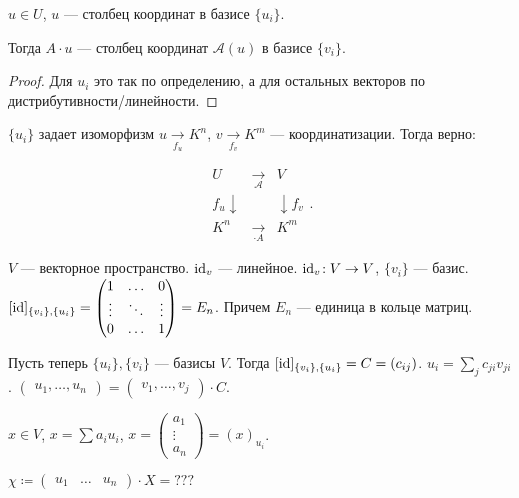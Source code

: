 \begin{statement}
    $u \in U$,  $u$ --- столбец координат в базисе  $\{u_i\}$.

    Тогда  $A \cdot u$ --- столбец координат  $\mathcal{A}(u)$ в базисе  $\{v_i\}$.
\end{statement}
\begin{proof}
    Для $u_i$ это так по определению, а для остальных векторов по дистрибутивности/линейности. 
\end{proof}
\begin{remark}
    $\{u_i\}$ задает изоморфизм  $u \xrightarrow[f_u]{} K^n$,  $v \xrightarrow[f_v]{} K^m$ --- координатизации. Тогда верно:

    \[
    \begin{matrix}
        U & \xrightarrow[\mathcal{A}]{} & V \\
        f_u \downarrow & & \downarrow f_v \\
        K^n & \xrightarrow[\cdot A]{} & K^m
    \end{matrix}
    .\] 
\end{remark}

$V$ --- векторное пространство.  $\operatorname{id}_v$ --- линейное.  $\operatorname{id}_v\!: V \to V$,  $\{v_i\}$ --- базис.  $[\operatorname{id}]_{\{v_i\}, \{u_i\}} = \begin{pmatrix} 1 & \ldots & 0 \\ \vdots & \ddots & \vdots \\ 0 & \ldots & 1 \end{pmatrix} = E_n$. Причем  $E_n$ --- единица в кольце матриц.


Пусть теперь $\{u_i\}, \{v_i\}$ --- базисы  $V$. Тогда  $[\operatorname{id}]_{\{v_i\}, \{u_i\}} = C = (c_{ij})$. $u_i = \sum_j c_{ji} v_{ji}$.  $\begin{pmatrix} u_1, \ldots, u_n\end{pmatrix} = \begin{pmatrix}v_1, \ldots, v_j \end{pmatrix} \cdot C$.

$x\in V$,  $x = \sum a_i u_i$,  $x = \begin{pmatrix} a_1 \\ \vdots \\ a_n \end{pmatrix} = (x)_{u_i}$.

$\chi \coloneqq \begin{pmatrix} u_1 & \ldots & u_n \end{pmatrix} \cdot X= ???$

